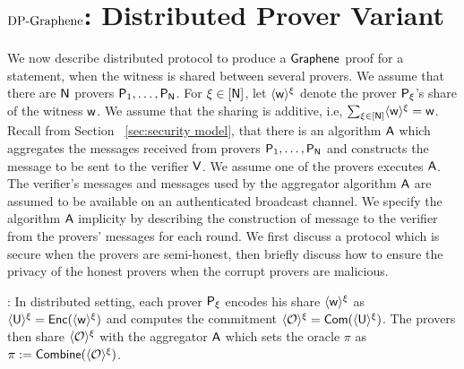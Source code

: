 \section{$\text{DP-Graphene}$: Distributed Prover Variant}\label{sec:dpgraphen}
We now describe distributed protocol to produce a $\textsf{Graphene}$ proof for a
statement, when the witness is shared between several provers. We assume that
there are $\mathsf{N}$ provers $\mathsf{P}_1,\ldots,\mathsf{P}_{\mathsf{N}}$. For $\xi\in [\mathsf{N}]$,
let $\langle{\mathsf{w}}\rangle^\xi$ denote the prover $\mathsf{P}_\xi$'s share of the witness $\mathsf{w}$.
We assume that the sharing is additive, i.e, $\sum_{\xi\in [\mathsf{N}]} \langle{\mathsf{w}}\rangle^\xi =
\mathsf{w}$. Recall from Section ~\ref{sec:security model}, that there is an algorithm $\mathsf{A}$ 
which aggregates the messages received
from provers $\mathsf{P}_1,\ldots,\mathsf{P}_{\mathsf{N}}$ and constructs the message to be
sent to the verifier $\mathsf{V}$. We assume one of the provers executes $\mathsf{A}$.
The verifier's  messages and messages used by the aggregator algorithm $\mathsf{A}$ 
are assumed to be available on an authenticated broadcast
channel. We specify the algorithm $\mathsf{A}$ implicity by describing the construction
of message to the verifier from the provers' messages for each round.
We first discuss a protocol which is secure when the provers are semi-honest, then 
briefly discuss how to ensure the privacy of the honest provers when the corrupt 
provers are malicious. 

: In distributed setting, each prover
$\mathsf{P}_\xi$ encodes his share $\langle{\mathsf{w}}\rangle^\xi$ as $\langle{\mathsf{U}}\rangle^\xi=\mathsf{Enc}(\langle{\mathsf{w}}\rangle^\xi)$
and computes the commitment $\langle{\mathcal{O}}\rangle^\xi=\mathsf{Com}(\langle{\mathsf{U}}\rangle^\xi)$. The provers
then share $\langle{\mathcal{O}}\rangle^\xi$ with the aggregator $\mathsf{A}$ which sets the oracle
$\pi$ as $\pi := \mathsf{Combine}(\langle{\mathcal{O}}\rangle^\xi)$.  

\begin{comment}
\noindent{\bf Distributed Proximity Test}: The provers jointly prove that 
the oracle is well formed as follows: On receiving the verifier’s challenge 
$r\in\FF^p$ on broadcast channel, the prover $\distprover$ locally computes
$\shr{\tilde{U}}=\sum_{i\in [p]}r_i\shr{\ewit}[i,\cdot,\cdot]$, commitments
$\shr{\tilde{c}_k}=\sum_{i\in [p]}\shr{\comoracle}[i,k]$ for $k\in [\ell]$. They
send the shares of the commitments to the aggregator, who computes
$(\tilde{c}_1,\ldots,\tilde{c}_\ell)=\combine(\shr{\tilde{c}_1},\ldots,\shr{\tilde{c}_\ell})$
and forwards these to the verifier. Next, the provers jointly prove that
$\tilde{c}_1,\ldots,\tilde{c}_\ell$ corresponds to a matrix $\overline{U}$ such
that $\overline{U}\mc{T}\in \mc{C}_2$. This is done via distributed variant of
membership protocol that we describe next.  

\noindent{\bf Distributed Membership Test}: 
This protocol reduces to each prover responding to verifier’s
challenge on their share, as in the single    prover setting. The prover
responses are aggregated to compute the response to    the verifier. The
complete protocol appears in Figure \ref{fig:distprox2d}. In Figure
\ref{fig:distprox2d}, we note that the aggregator obtains the witness to the
inner product protocol in step 7, and hence does not need to interact further
with the provers. 
\end{comment}

